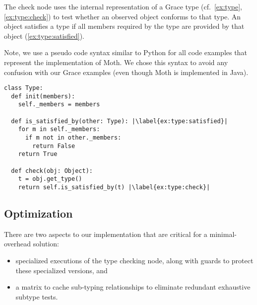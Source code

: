 
%

The check node uses the internal representation of a Grace type
(cf.\ \cref{ex:type}, \cref{ex:type:check}) to test whether an observed
object conforms to that type. 
An object satisfies a type if all members required by the type are provided
by that object (\cref{ex:type:satisfied}).

Note, we use a pseudo code syntax similar to Python for all code examples
that represent the implementation of Moth.
We chose this syntax to avoid any confusion with our Grace examples
(even though Moth is implemented in Java).


\begin{lstlisting}[label={ex:type},escapechar=|,%
  caption={Sketch of a \code{Type} in our system and its \code{check()} semantics.},%
  float,floatplacement=htb,columns=flexible,float,floatplacement=H,morekeywords={not}]
class Type:
  def init(members):
    self._members = members

  def is_satisfied_by(other: Type): |\label{ex:type:satisfied}|
    for m in self._members:
      if m not in other._members:
        return False
    return True

  def check(obj: Object):
    t = obj.get_type()
    return self.is_satisfied_by(t) |\label{ex:type:check}|
\end{lstlisting}


\subsection{Optimization}
\label{ssec:optimization}

There are two aspects to our implementation that are critical for a minimal-overhead solution:

\begin{itemize}
  \item specialized executions of the type checking node, along with guards to protect these specialized versions, and
  \item a matrix to cache sub-typing relationships to eliminate
    redundant exhaustive subtype tests.
\end{itemize}
 

